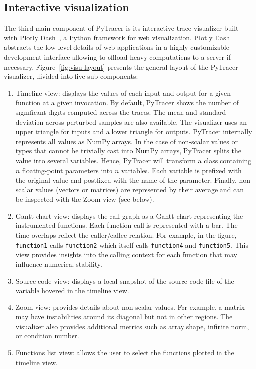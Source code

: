 \documentclass[10pt,journal,compsoc]{IEEEtran}
\newcommand{\pytracer}[0]{PyTracer\xspace}
\begin{document}
\subsection{Interactive visualization}
The third main component of \pytracer is its interactive trace visualizer built
with Plotly Dash~\cite{plotly}, a Python framework for web visualization. Plotly
Dash abstracts the low-level details of web applications in a highly
customizable development interface allowing to offload heavy computations to a
server if necessary. Figure~\ref{fig:visu-layout} presents the general layout of
the \pytracer visualizer, divided into five sub-components:
\begin{enumerate}
    \item Timeline view: displays the values of each input and output for a
          given function at a given invocation. By default, \pytracer shows the
          number of significant digits computed across the traces. The mean and
          standard deviation across perturbed samples are also available. The
          visualizer uses an upper triangle for inputs and a lower triangle for
          outputs. \pytracer internally represents all values as NumPy arrays.
          In the case of non-scalar values or types that cannot be trivially
          cast into NumPy arrays, \pytracer splits the value into several
          variables. Hence, \pytracer will transform a class containing $n$
          floating-point parameters into $n$ variables. Each variable is
          prefixed with the original value and postfixed with the name of the
          parameter. Finally, non-scalar values (vectors or matrices) are
          represented by their average and can be inspected with the Zoom view
          (see below).
    \item Gantt chart view: displays the call graph as a Gantt chart
          representing the instrumented functions. Each function call is
          represented with a bar. The time overlaps reflect the caller/callee
          relation. For example, in the figure, \texttt{function1} calls
          \texttt{function2} which itself calls \texttt{function4} and
          \texttt{function5}. This view provides insights into the calling
          context for each function that may influence numerical stability.
    \item  Source code view: displays a local snapshot of the source code file
          of the variable hovered in the timeline view.
    \item Zoom view: provides details about non-scalar values. For example, a
          matrix may have instabilities around its diagonal but not in other
          regions. The visualizer also provides additional metrics such as array
          shape, infinite norm, or condition number.
    \item  Functions list view: allows the user to select the functions plotted
          in the timeline view.
\end{enumerate}
\end{document}
